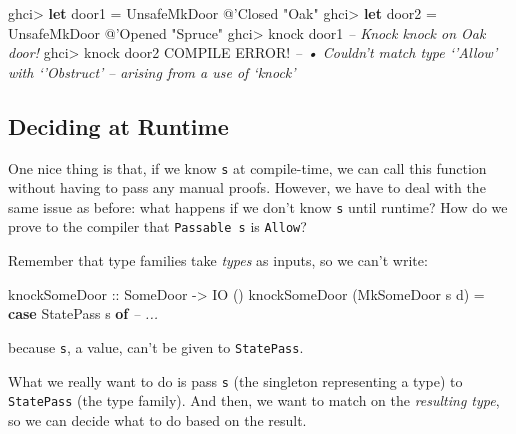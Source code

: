 \documentclass[]{article}
\newenvironment{Shaded}{}{}
\newcommand{\CommentTok}[1]{\textcolor[rgb]{0.38,0.63,0.69}{\textit{#1}}}
\newcommand{\DataTypeTok}[1]{\textcolor[rgb]{0.56,0.13,0.00}{#1}}
\newcommand{\FunctionTok}[1]{\textcolor[rgb]{0.02,0.16,0.49}{#1}}
\newcommand{\KeywordTok}[1]{\textcolor[rgb]{0.00,0.44,0.13}{\textbf{#1}}}
\newcommand{\NormalTok}[1]{#1}
\newcommand{\OtherTok}[1]{\textcolor[rgb]{0.00,0.44,0.13}{#1}}
\newcommand{\StringTok}[1]{\textcolor[rgb]{0.25,0.44,0.63}{#1}}
\begin{document}
\begin{Shaded}
\begin{Highlighting}[]
\NormalTok{ghci}\FunctionTok{>} \KeywordTok{let}\NormalTok{ door1 }\FunctionTok{=} \DataTypeTok{UnsafeMkDoor} \FunctionTok{@}\NormalTok{'}\DataTypeTok{Closed} \StringTok{"Oak"}
\NormalTok{ghci}\FunctionTok{>} \KeywordTok{let}\NormalTok{ door2 }\FunctionTok{=} \DataTypeTok{UnsafeMkDoor} \FunctionTok{@}\NormalTok{'}\DataTypeTok{Opened} \StringTok{"Spruce"}
\NormalTok{ghci}\FunctionTok{>}\NormalTok{ knock door1}
\CommentTok{-- Knock knock on Oak door!}
\NormalTok{ghci}\FunctionTok{>}\NormalTok{ knock door2}
\DataTypeTok{COMPILE} \DataTypeTok{ERROR}\FunctionTok{!}
\CommentTok{--     • Couldn't match type ‘'Allow’ with ‘'Obstruct’}
\CommentTok{--             arising from a use of ‘knock’}
\end{Highlighting}
\end{Shaded}

\hypertarget{deciding-at-runtime}{%
\subsection{Deciding at Runtime}\label{deciding-at-runtime}}

One nice thing is that, if we know \texttt{s} at compile-time, we can call this
function without having to pass any manual proofs. However, we have to deal with
the same issue as before: what happens if we don't know \texttt{s} until
runtime? How do we prove to the compiler that \texttt{Passable\ s} is
\texttt{\textquotesingle{}Allow}?

Remember that type families take \emph{types} as inputs, so we can't write:

\begin{Shaded}
\begin{Highlighting}[]
\OtherTok{knockSomeDoor ::} \DataTypeTok{SomeDoor} \OtherTok{->} \DataTypeTok{IO}\NormalTok{ ()}
\NormalTok{knockSomeDoor (}\DataTypeTok{MkSomeDoor}\NormalTok{ s d) }\FunctionTok{=}
    \KeywordTok{case} \DataTypeTok{StatePass}\NormalTok{ s }\KeywordTok{of}
      \CommentTok{-- ...}
\end{Highlighting}
\end{Shaded}

because \texttt{s}, a value, can't be given to \texttt{StatePass}.

What we really want to do is pass \texttt{s} (the singleton representing a type)
to \texttt{StatePass} (the type family). And then, we want to match on the
\emph{resulting type}, so we can decide what to do based on the result.
\end{document}
